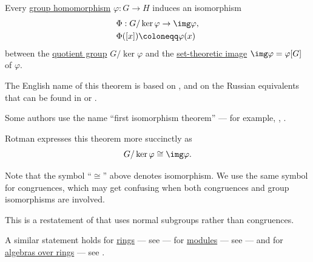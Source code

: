 \begin{theorem}\label{thm:homomorphism_theorem_for_groups}
  Every \hyperref[def:group/morphism]{group homomorphism} \( {\varphi: G \to H} \) induces an isomorphism
  \begin{equation*}
    \begin{aligned}
      &\Phi: G / \ker \varphi \to \img \varphi, \\
      &\Phi([x]) \coloneqq \varphi(x)
    \end{aligned}
  \end{equation*}
  between the \hyperref[def:group/quotient]{quotient group} \( G / \ker \varphi \) and the \hyperref[def:set_valued_function/image]{set-theoretic image} \( \img \varphi = \varphi[G] \) of \( \varphi \).
\end{theorem}
\begin{comments}
  \item The English name of this theorem is based on \cite[thm. 1.23]{LidlNiederreiter1997FiniteFields}, and on the Russian equivalents that can be found in \cite[409]{Курош1968КурсВысшейАлгебры} or \cite[\S D2.4]{Тыртышников2007ЛинейнаяАлгебра}.

  Some authors use the name \enquote{first isomorphism theorem} --- for example, \textcite[thm. 2.27]{Knapp2016BasicAlgebra}, \textcite[thm A-3.43]{Rotman2015AdvancedModernAlgebraPart1}.

  Rotman expresses this theorem more succinctly as
  \begin{equation*}
    G / \ker \varphi \cong \img \varphi.
  \end{equation*}

  Note that the symbol \enquote{\( \cong \)} above denotes isomorphism. We use the same symbol for congruences, which may get confusing when both congruences and group isomorphisms are involved.

  \item This is a restatement of  that uses normal subgroups rather than congruences.

  A similar statement holds for \hyperref[def:ring]{rings} --- see  --- for \hyperref[def:module]{modules} --- see  --- and for \hyperref[def:algebra_over_ring]{algebras over rings} --- see .
\end{comments}
